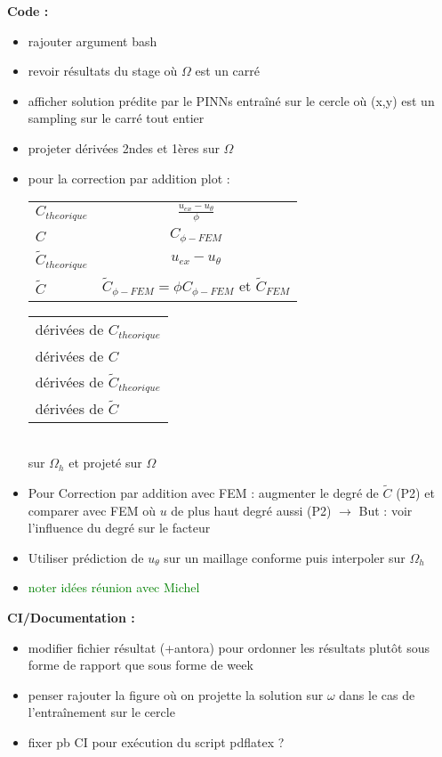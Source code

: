 \textbf{Code :}
\begin{itemize}[label=$\square$] 
	\item[\done] rajouter argument bash
	\item revoir résultats du stage où $\Omega$ est un carré
	\item afficher solution prédite par le PINNs entraîné sur le cercle où (x,y) est un sampling sur le carré tout entier
	\item projeter dérivées 2ndes et 1ères sur $\Omega$
	\item pour la correction par addition plot : \\
	\begin{minipage}{0.48\linewidth}
		\begin{tabular}[\linewidth]{lc}
			$C_{theorique}$ & $\frac{u_{ex}-u_\theta}{\phi}$ \\
			$C$ & $C_{\phi-FEM}$ \\
			$\tilde{C}_{theorique}$ & $u_{ex}-u_\theta$ \\
			$\tilde{C}$ & $\tilde{C}_{\phi-FEM}=\phi C_{\phi-FEM}$ et $\tilde{C}_{FEM}$
		\end{tabular}
	\end{minipage}
	\begin{minipage}{0.48\linewidth}
		\begin{tabular}[\linewidth]{l}
			dérivées de $C_{theorique}$ \\
			dérivées de $C$ \\
			dérivées de $\tilde{C}_{theorique}$ \\
			dérivées de $\tilde{C}$
		\end{tabular}
	\end{minipage} \\
	sur $\Omega_h$ et projeté sur $\Omega$
	\item Pour Correction par addition avec FEM : augmenter le degré de $\tilde{C}$ (P2) et comparer avec FEM où $u$ de plus haut degré aussi (P2) $\rightarrow$ But : voir l'influence du degré sur le facteur
	\item Utiliser prédiction de $u_\theta$ sur un maillage conforme puis interpoler sur $\Omega_h$
	\item \textcolor{green}{noter idées réunion avec Michel}
\end{itemize}
\textbf{CI/Documentation :}
\begin{itemize}[label=$\square$] 
	\item modifier fichier résultat (+antora) pour ordonner les résultats plutôt sous forme de rapport que sous forme de week
	\item penser rajouter la figure où on projette la solution sur $\omega$ dans le cas de l'entraînement sur le cercle
	\item fixer pb CI pour exécution du script pdflatex ?
\end{itemize}

